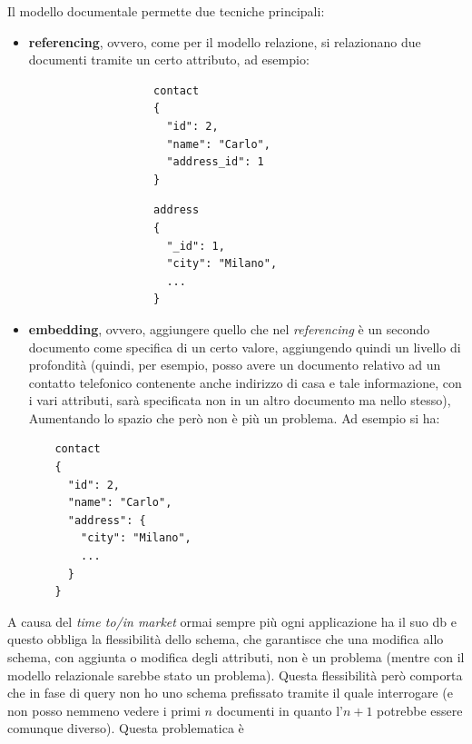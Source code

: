 \documentclass[a4paper,12pt, oneside]{book}
\begin{document}
Il modello documentale permette due tecniche principali:
\begin{itemize}
  \item \textbf{referencing}, ovvero, come per il modello relazione, si
  relazionano due documenti tramite un certo attributo, ad esempio:
  \begin{figure}[H]
    \centering
    \begin{subfigure}{.4\textwidth}
      \centering
      \begin{verbatim}
        contact
        {
          "id": 2,
          "name": "Carlo",
          "address_id": 1
        }
      \end{verbatim}
    \end{subfigure}
    \begin{subfigure}{.4\textwidth}
      \centering
      \begin{verbatim}
        address
        {
          "_id": 1,
          "city": "Milano",
          ...
        }
      \end{verbatim}
    \end{subfigure}
  \end{figure}
  
  \item \textbf{embedding}, ovvero, aggiungere quello che nel
  \textit{referencing} è un secondo documento come specifica di un certo valore,
  aggiungendo quindi un livello di profondità (quindi, per esempio, posso avere
  un documento relativo ad un contatto telefonico contenente anche indirizzo
  di casa e tale informazione, con i vari attributi, sarà specificata non in un
  altro documento ma nello stesso), Aumentando lo spazio che però non è più un
  problema. Ad esempio si ha:
  \begin{verbatim}
    contact
    {
      "id": 2,
      "name": "Carlo",
      "address": {
        "city": "Milano",
        ...
      }
    }
  \end{verbatim}
\end{itemize}
A causa del\textit{ time to/in market} ormai sempre più ogni applicazione ha il
suo db e questo obbliga la flessibilità dello schema, che garantisce che una
modifica allo schema, con aggiunta o modifica degli attributi, non è un problema
(mentre con il modello relazionale sarebbe stato un problema). Questa
flessibilità però comporta che in fase di query non ho uno schema prefissato
tramite il quale interrogare (e non posso nemmeno vedere i primi $n$ documenti
in quanto l'$n+1$ potrebbe essere comunque diverso). Questa problematica è
\end{document}
